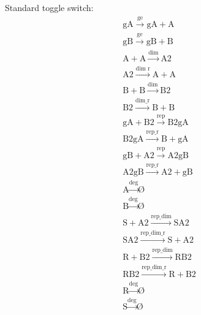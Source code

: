 Standard toggle switch:
$$
\begin{array}{cccc}
      \textrm{gA}\stackrel{\textrm{ge}}{\longrightarrow}\textrm{gA} + \textrm{A} \\
      \textrm{gB}\stackrel{\textrm{ge}}{\longrightarrow}\textrm{gB} + \textrm{B} \\
      \textrm{A} + \textrm{A} \stackrel{\textrm{dim}}{\longrightarrow}\textrm{A2} \\
      \textrm{A2} \stackrel{\textrm{dim r}}{\longrightarrow}\textrm{A} + \textrm{A} \\
      \textrm{B} + \textrm{B} \stackrel{\textrm{dim}}{\longrightarrow} \textrm{B2} \\
      \textrm{B2} \stackrel{\textrm{dim\_r}}{\longrightarrow}\textrm{B} + \textrm{B} \\
      \textrm{gA} + \textrm{B2} \stackrel{\textrm{rep}}{\longrightarrow}\textrm{B2gA} \\
      \textrm{B2gA} \stackrel{\textrm{rep\_r}}{\longrightarrow}\textrm{B} + \textrm{gA} \\
      \textrm{gB} + \textrm{A2} \stackrel{\textrm{rep}}{\longrightarrow}\textrm{A2gB} \\
      \textrm{A2gB} \stackrel{\textrm{rep\_r}}{\longrightarrow}\textrm{A2} + \textrm{gB} \\
      \textrm{A} \stackrel{\textrm{deg}}{\longrightarrow}\textrm{\O}\\
      \textrm{B} \stackrel{\textrm{deg}}{\longrightarrow}\textrm{\O}\\
      \textrm{S} + \textrm{A2} \stackrel{\textrm{rep\_dim}}{\longrightarrow}\textrm{SA2}\\
      \textrm{SA2} \stackrel{\textrm{rep\_dim\_r}}{\longrightarrow}\textrm{S} + \textrm{A2}\\
      \textrm{R} + \textrm{B2} \stackrel{\textrm{rep\_dim}}{\longrightarrow}\textrm{RB2}\\
      \textrm{RB2} \stackrel{\textrm{rep\_dim\_r}}{\longrightarrow}\textrm{R} + \textrm{B2}\\
      \textrm{R} \stackrel{\textrm{deg}}{\longrightarrow} \textrm{\O}\\
      \textrm{S} \stackrel{\textrm{deg}}{\longrightarrow}\textrm{\O}\\
\end{array}
$$

